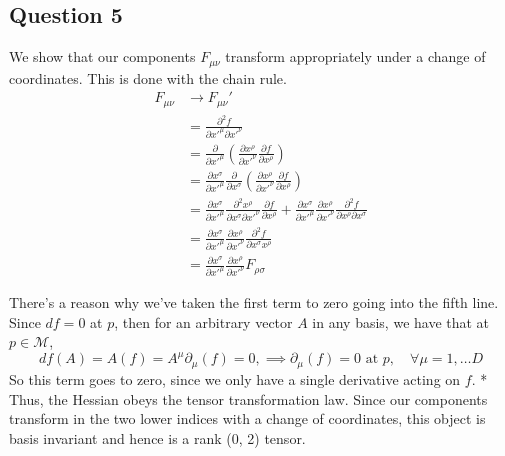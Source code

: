 \subsection{Question 5} 
We show that our components $F_{\mu \nu}$ transform appropriately under a change of coordinates. This is done with the chain rule. 
\begin{align*} 
F_{ \mu \nu} & \rightarrow F_{ \mu \nu}' \\
&= \frac{ \partial^2 f}{ \partial x'^\mu \partial x'^\nu} \\
&= \frac{ \partial}{ \partial x '^\mu } \left( \frac{ \partial x^\rho }{ \partial x'^\nu } \frac{ \partial f }{ \partial x^\rho } \right) \\
&= \frac{ \partial x^\sigma}{ \partial x'^\mu } \frac{ \partial }{ \partial x^\sigma} \left( \frac{ \partial x^\rho}{ \partial x'^\nu} \frac{ \partial f}{ \partial x^\rho } \right) \\
&= \frac{ \partial x^\sigma}{ \partial x'^\mu} \frac{ \partial^2 x^\rho}{ \partial x^\sigma \partial x'^\nu } \frac{ \partial f }{ \partial x^\rho} + \frac{ \partial x^\sigma }{ \partial x'^\mu }\frac{\partial x^\rho}{\partial x'^\nu}\frac{\partial^2 f}{ \partial x^\rho \partial x^\sigma } \\
&= \frac{ \partial x^\sigma}{ \partial x'^\mu } \frac{ \partial x^\rho}{ \partial x'^\nu } \frac{ \partial^2 f }{ \partial x^\sigma x^\rho } \\
& =   \frac{ \partial x^\sigma}{ \partial x'^\mu } \frac{ \partial x^\rho}{ \partial x'^\nu } F_{\rho \sigma} 
\end{align*} 

There's a reason why we've taken the first term to zero going into the fifth line. 
Since $ df = 0 $ at $ p$,  then for an arbitrary vector $ A$ in any basis, we
have that at $ p \in \mathcal{ M } $,  
\[
df ( A) = A( f) = A^{\mu } \partial_\mu ( f) = 0, \implies \partial_\mu ( f) = 0 \text{ at } p, \quad \forall \mu = 1, \dots D
\] 
So this term goes to zero, since we only have a single derivative acting on $ f $. *
Thus, the Hessian obeys the tensor transformation law. Since our components transform in the two lower indices with a change of coordinates, this object is basis invariant and hence is a rank (0, 2) tensor. 

